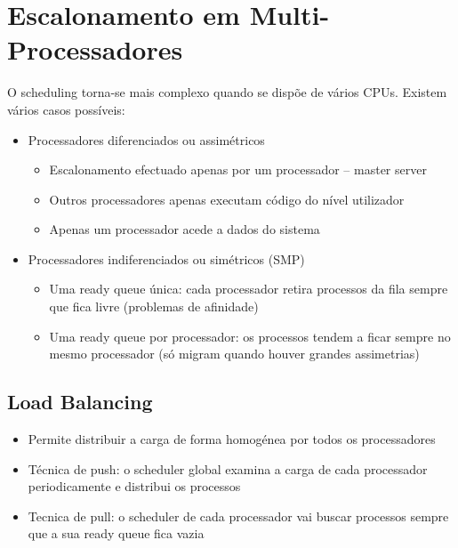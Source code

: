 \documentclass[10pt,a4paper]{report}
\begin{document}
\section{Escalonamento em Multi-Processadores}
O scheduling torna-se mais complexo quando se dispõe de vários CPUs. Existem vários casos possíveis:
\begin{itemize}
\item Processadores diferenciados ou assimétricos
\begin{itemize}
\item Escalonamento efectuado apenas por um processador – master server
\item Outros processadores apenas executam código do nível utilizador
\item Apenas um processador acede a dados do sistema
\end{itemize}
\item Processadores indiferenciados ou simétricos (SMP)
\begin{itemize}
\item Uma ready queue única: cada processador retira processos da fila sempre que fica livre (problemas de afinidade)
\item Uma ready queue por processador: os processos tendem a ficar sempre no mesmo processador (só migram quando houver grandes assimetrias)
\end{itemize}
\end{itemize}
\subsection{Load Balancing}
\begin{itemize}
\item Permite distribuir a carga de forma homogénea por todos os processadores
\item Técnica de push: o scheduler global examina a carga de cada processador periodicamente e distribui os processos
\item Tecnica de pull: o scheduler de cada processador vai buscar processos sempre que a sua ready queue fica vazia
\end{itemize}
\end{document}
